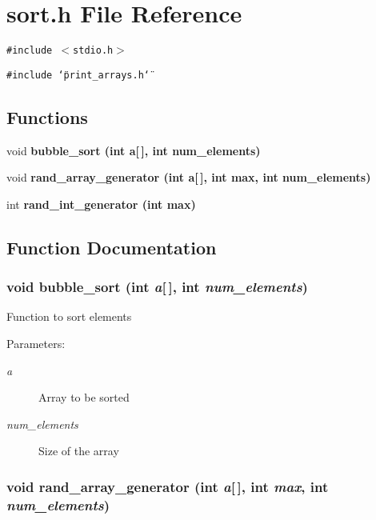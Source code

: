 \section{sort.h File Reference}
\label{sort_8h}
{\tt \#include $<$stdio.h$>$}\par
{\tt \#include \char`\"{}print\_\-arrays.h\char`\"{}}\par
\subsection*{Functions}
\begin{CompactItemize}
\item 
void \bf{bubble\_\-sort} (int a[$\,$], int num\_\-elements)
\item 
void \bf{rand\_\-array\_\-generator} (int a[$\,$], int max, int num\_\-elements)
\item 
int \bf{rand\_\-int\_\-generator} (int max)
\end{CompactItemize}


\subsection{Function Documentation}
\subsubsection{\setlength{\rightskip}{0pt plus 5cm}void bubble\_\-sort (int {\em a}[$\,$], int {\em num\_\-elements})}\label{sort_8h_e40725bff7208eca19d61ea6f1dfd024}


Function to sort elements \begin{Desc}
\item[Parameters:]
\begin{description}
\item[{\em a}]Array to be sorted \item[{\em num\_\-elements}]Size of the array \end{description}
\end{Desc}
\subsubsection{\setlength{\rightskip}{0pt plus 5cm}void rand\_\-array\_\-generator (int {\em a}[$\,$], int {\em max}, int {\em num\_\-elements})}\label{sort_8h_68653cbd4df25153bb660c3a2bd4c1c3}


